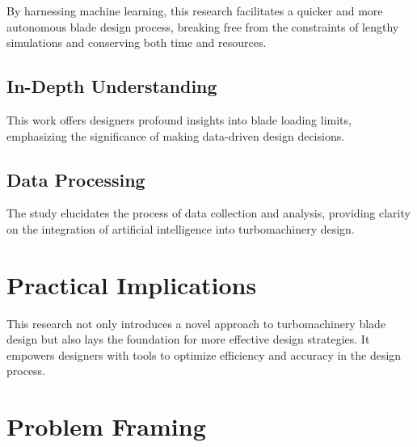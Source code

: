\documentclass[11pt,a4paper,twocolumn]{article}
\begin{document}
By harnessing machine learning, this research facilitates a quicker and more autonomous blade design process, breaking free from the constraints of lengthy simulations and conserving both time and resources.

\subsection{In-Depth Understanding}

This work offers designers profound insights into blade loading limits, emphasizing the significance of making data-driven design decisions.

\subsection{Data Processing}

The study elucidates the process of data collection and analysis, providing clarity on the integration of artificial intelligence into turbomachinery design.

\section{Practical Implications}

This research not only introduces a novel approach to turbomachinery blade design but also lays the foundation for more effective design strategies. It empowers designers with tools to optimize efficiency and accuracy in the design process.

\section{Problem Framing}

\end{document}
